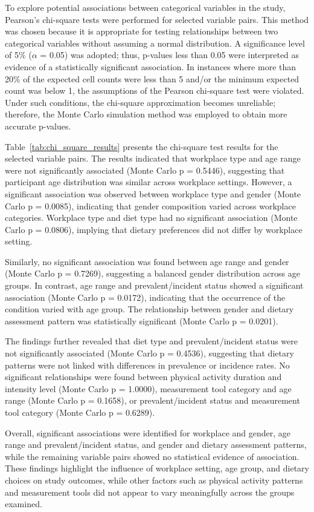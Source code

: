 \newpage
To explore potential associations between categorical variables in the study, Pearson's chi-square tests were performed for selected variable pairs. This method was chosen because it is appropriate for testing relationships between two categorical variables without assuming a normal distribution. A significance level of 5\% ($\alpha$ = 0.05) was adopted; thus, p-values less than 0.05 were interpreted as evidence of a statistically significant association. In instances where more than 20\% of the expected cell counts were less than 5 and/or the minimum expected count was below 1, the assumptions of the Pearson chi-square test were violated. Under such conditions, the chi-square approximation becomes unreliable; therefore, the Monte Carlo simulation method was employed to obtain more accurate p-values.

Table~\ref{tab:chi_square_results} presents the chi-square test results for the selected variable pairs. The results indicated that workplace type and age range were not significantly associated (Monte Carlo p = 0.5446), suggesting that participant age distribution was similar across workplace settings. However, a significant association was observed between workplace type and gender (Monte Carlo p = 0.0085), indicating that gender composition varied across workplace categories. Workplace type and diet type had no significant association (Monte Carlo p = 0.0806), implying that dietary preferences did not differ by workplace setting.

Similarly, no significant association was found between age range and gender (Monte Carlo p = 0.7269), suggesting a balanced gender distribution across age groups. In contrast, age range and prevalent/incident status showed a significant association (Monte Carlo p = 0.0172), indicating that the occurrence of the condition varied with age group. The relationship between gender and dietary assessment pattern was statistically significant (Monte Carlo p = 0.0201).

The findings further revealed that diet type and prevalent/incident status were not significantly associated (Monte Carlo p = 0.4536), suggesting that dietary patterns were not linked with differences in prevalence or incidence rates. No significant relationships were found between physical activity duration and intensity level (Monte Carlo p = 1.0000), measurement tool category and age range (Monte Carlo p = 0.1658), or prevalent/incident status and measurement tool category (Monte Carlo p = 0.6289).

Overall, significant associations were identified for workplace and gender, age range and prevalent/incident status, and gender and dietary assessment patterns, while the remaining variable pairs showed no statistical evidence of association. These findings highlight the influence of workplace setting, age group, and dietary choices on study outcomes, while other factors such as physical activity patterns and measurement tools did not appear to vary meaningfully across the groups examined. 


